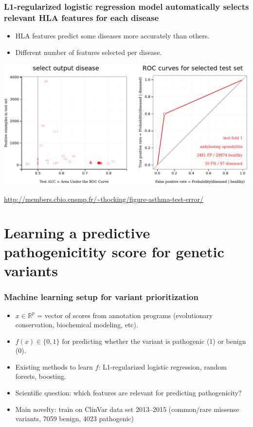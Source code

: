 \documentclass{beamer}
\begin{document}
\begin{frame}
  \frametitle{L1-regularized logistic regression model automatically selects relevant HLA features for each
    disease}

  \begin{itemize}
  \item HLA features predict some diseases more accurately than others.
  \item Different number of features selected per disease.
  \end{itemize}
  \includegraphics[width=\textwidth]{screenshot-ankylosing-spondylitis}

\scriptsize  \url{http://members.cbio.ensmp.fr/~thocking/figure-asthma-test-error/}
\end{frame}

\section{Learning a predictive pathogenicitity score for genetic variants}

\begin{frame}
  \frametitle{Machine learning setup for variant prioritization}
  \begin{itemize}
  \item $x\in\mathbb R^p$ = vector of scores from 
    annotation programs (evolutionary conservation, biochemical
    modeling, etc).
  \item $f(x)\in\{0,1\}$ for predicting whether the variant is
    pathogenic (1) or benign (0).
  \item Existing methods to learn $f$: L1-regularized logistic
    regression, random forests, boosting.
  \item Scientific question: which features are relevant for
    predicting pathogenicity?
  \item Main novelty: train on ClinVar data set 2013--2015
    (common/rare missense variants, 7059 benign, 4023 pathogenic)
  \end{itemize}
\end{frame}
\end{document}
